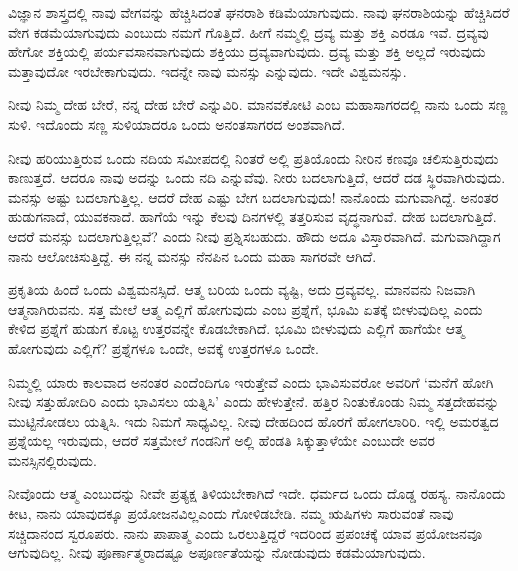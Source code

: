ವಿಜ್ಞಾನ ಶಾಸ್ತ್ರದಲ್ಲಿ ನಾವು ವೇಗವನ್ನು ಹೆಚ್ಚಿಸಿದಂತೆ ಘನರಾಶಿ  ಕಡಿಮೆಯಾಗುವುದು. ನಾವು ಘನರಾಶಿಯನ್ನು  ಹೆಚ್ಚಿಸಿದರೆ ವೇಗ ಕಡಮೆಯಾಗುವುದು ಎಂಬುದು ನಮಗೆ ಗೊತ್ತಿದೆ. ಹೀಗೆ ನಮ್ಮಲ್ಲಿ ದ್ರವ್ಯ ಮತ್ತು ಶಕ್ತಿ ಎರಡೂ ಇವೆ. ದ್ರವ್ಯವು ಹೇಗೋ ಶಕ್ತಿಯಲ್ಲಿ ಪರ್ಯವಸಾನವಾಗುವುದು ಶಕ್ತಿಯು ದ್ರವ್ಯವಾಗುವುದು. ದ್ರವ್ಯ ಮತ್ತು ಶಕ್ತಿ ಅಲ್ಲದೆ ಇರುವುದು ಮತ್ತಾವುದೋ ಇರಬೇಕಾಗುವುದು. ಇದನ್ನೇ ನಾವು ಮನಸ್ಸು ಎನ್ನುವುದು. ಇದೇ ವಿಶ್ವಮನಸ್ಸು.

\vskip 4pt

ನೀವು ನಿಮ್ಮ ದೇಹ ಬೇರೆ, ನನ್ನ ದೇಹ ಬೇರೆ ಎನ್ನುವಿರಿ. ಮಾನವಕೋಟಿ ಎಂಬ ಮಹಾಸಾಗರದಲ್ಲಿ ನಾನು ಒಂದು ಸಣ್ಣ ಸುಳಿ. ಇದೊಂದು ಸಣ್ಣ ಸುಳಿಯಾದರೂ ಒಂದು ಅನಂತಸಾಗರದ ಅಂಶವಾಗಿದೆ.

ನೀವು ಹರಿಯುತ್ತಿರುವ ಒಂದು ನದಿಯ ಸಮೀಪದಲ್ಲಿ ನಿಂತರೆ ಅಲ್ಲಿ ಪ್ರತಿಯೊಂದು ನೀರಿನ ಕಣವೂ ಚಲಿಸುತ್ತಿರುವುದು ಕಾಣುತ್ತದೆ. ಆದರೂ ನಾವು ಅದನ್ನು ಒಂದು ನದಿ ಎನ್ನುವೆವು. ನೀರು ಬದಲಾಗುತ್ತಿದೆ, ಆದರೆ ದಡ ಸ್ಥಿರವಾಗಿರುವುದು. ಮನಸ್ಸು ಅಷ್ಟು ಬದಲಾಗುತ್ತಿಲ್ಲ. ಆದರೆ ದೇಹ ಎಷ್ಟು ಬೇಗ ಬದಲಾಗುವುದು! ನಾನೊಂದು ಮಗುವಾಗಿದ್ದೆ. ಅನಂತರ ಹುಡುಗನಾದೆ, ಯುವಕನಾದೆ. ಹಾಗೆಯೆ ಇನ್ನು ಕೆಲವು ದಿನಗಳಲ್ಲಿ ತತ್ತರಿಸುವ ವೃದ್ಧನಾಗುವೆ. ದೇಹ ಬದಲಾಗುತ್ತಿದೆ. ಆದರೆ ಮನಸ್ಸು ಬದಲಾಗುತ್ತಿಲ್ಲವೆ? ಎಂದು ನೀವು ಪ್ರಶ್ನಿಸಬಹುದು. ಹೌದು ಅದೂ ವಿಸ್ತಾರವಾಗಿದೆ. ಮಗುವಾಗಿದ್ದಾಗ ನಾನು ಆಲೋಚಿಸುತ್ತಿದ್ದೆ. ಈ ನನ್ನ ಮನಸ್ಸು ನೆನಪಿನ ಒಂದು ಮಹಾ ಸಾಗರವೇ ಆಗಿದೆ.

ಪ್ರಕೃತಿಯ ಹಿಂದೆ ಒಂದು ವಿಶ್ವಮನಸ್ಸಿದೆ. ಆತ್ಮ ಬರಿಯ ಒಂದು ವ್ಯಷ್ಟಿ, ಅದು ದ್ರವ್ಯವಲ್ಲ. ಮಾನವನು ನಿಜವಾಗಿ ಆತ್ಮನಾಗಿರುವನು. ಸತ್ತ ಮೇಲೆ ಆತ್ಮ ಎಲ್ಲಿಗೆ ಹೋಗುವುದು ಎಂಬ ಪ್ರಶ್ನೆಗೆ, ಭೂಮಿ ಏತಕ್ಕೆ ಬೀಳುವುದಿಲ್ಲ ಎಂದು ಕೇಳಿದ ಪ್ರಶ್ನೆಗೆ ಹುಡುಗ ಕೊಟ್ಟ ಉತ್ತರವನ್ನೇ ಕೊಡಬೇಕಾಗಿದೆ. ಭೂಮಿ ಬೀಳುವುದು ಎಲ್ಲಿಗೆ ಹಾಗೆಯೇ ಆತ್ಮ ಹೋಗುವುದು ಎಲ್ಲಿಗೆ? ಪ್ರಶ್ನೆಗಳೂ ಒಂದೇ, ಅವಕ್ಕೆ ಉತ್ತರಗಳೂ ಒಂದೇ.

ನಿಮ್ಮಲ್ಲಿ ಯಾರು ಕಾಲವಾದ ಅನಂತರ ಎಂದೆಂದಿಗೂ ಇರುತ್ತೇವೆ ಎಂದು ಭಾವಿಸುವರೋ ಅವರಿಗೆ ‘ಮನೆಗೆ ಹೋಗಿ ನೀವು ಸತ್ತುಹೋದಿರಿ ಎಂದು ಭಾವಿಸಲು ಯತ್ನಿಸಿ’ ಎಂದು ಹೇಳುತ್ತೇನೆ. ಹತ್ತಿರ ನಿಂತುಕೊಂಡು ನಿಮ್ಮ ಸತ್ತದೇಹವನ್ನು ಮುಟ್ಟಿನೋಡಲು ಯತ್ನಿಸಿ. ಇದು ನಿಮಗೆ ಸಾಧ್ಯವಿಲ್ಲ. ನೀವು ದೇಹದಿಂದ ಹೊರಗೆ ಹೋಗಲಾರಿರಿ. ಇಲ್ಲಿ ಅಮರತ್ವದ ಪ್ರಶ್ನೆಯಲ್ಲ ಇರುವುದು, ಆದರೆ ಸತ್ತಮೇಲೆ ಗಂಡನಿಗೆ ಅಲ್ಲಿ ಹೆಂಡತಿ ಸಿಕ್ಕುತ್ತಾಳೆಯೇ ಎಂಬುದೇ ಅವರ ಮನಸ್ಸಿನಲ್ಲಿರುವುದು.

ನೀವೊಂದು ಆತ್ಮ ಎಂಬುದನ್ನು ನೀವೇ ಪ್ರತ್ಯಕ್ಷ ತಿಳಿಯಬೇಕಾಗಿದೆ ಇದೇ. ಧರ್ಮದ ಒಂದು ದೊಡ್ಡ ರಹಸ್ಯ. ನಾನೊಂದು ಕೀಟ, ನಾನು ಯಾವುದಕ್ಕೂ ಪ್ರಯೋಜನವಿಲ್ಲ\break ಎಂದು ಗೋಳಿಡಬೇಡಿ. ನಮ್ಮ ಋಷಿಗಳು ಸಾರುವಂತೆ ನಾವು ಸಚ್ಚಿದಾನಂದ ಸ್ವರೂಪರು. ನಾನು ಪಾಪಾತ್ಮ ಎಂದು ಒರಲುತ್ತಿದ್ದರೆ ಇದರಿಂದ ಪ್ರಪಂಚಕ್ಕೆ ಯಾವ ಪ್ರಯೋಜನವೂ ಆಗುವುದಿಲ್ಲ. ನೀವು ಪೂರ್ಣಾತ್ಮರಾದಷ್ಟೂ ಅಪೂರ್ಣತೆಯನ್ನು ನೋಡುವುದು ಕಡಮೆಯಾಗುವುದು.

